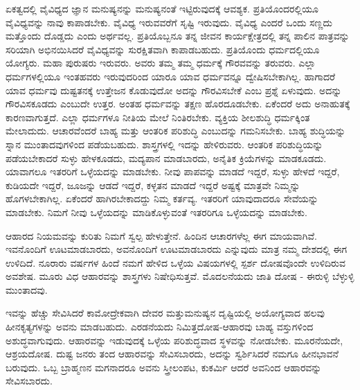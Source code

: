 ಏಕತ್ವದಲ್ಲಿ ವೈವಿಧ್ಯದ ಜ್ಞಾನ ಮನುಷ್ಯನನ್ನು ಮನುಷ್ಯನಂತೆ ಇಟ್ಟಿರುವುದಕ್ಕೆ ಆವಶ್ಯಕ. ಪ್ರತಿಯೊಂದರಲ್ಲಿಯೂ ವೈವಿಧ್ಯವನ್ನು ನಾವು ಕಾಪಾಡಬೇಕು. ವೈವಿಧ್ಯ ಇರುವವರೆಗೆ ಸೃಷ್ಟಿ ಇರುವುದು. ವೈವಿಧ್ಯ ಎಂದರೆ ಒಂದು ಸಣ್ಣದು ಮತ್ತೊಂದು ದೊಡ್ಡದು ಎಂದು ಅರ್ಥವಲ್ಲ. ಪ್ರತಿಯೊಬ್ಬನೂ ತನ್ನ ಜೀವನ ಕಾರ್ಯಕ್ಷೇತ್ರದಲ್ಲಿ ತನ್ನ ಪಾಲಿನ ಪಾತ್ರವನ್ನು ಸರಿಯಾಗಿ ಅಭಿನಯಿಸಿದರೆ ವೈವಿಧ್ಯವನ್ನು ಸುರಕ್ಷಿತವಾಗಿ ಕಾಪಾಡಬಹುದು. ಪ್ರತಿಯೊಂದು ಧರ್ಮದಲ್ಲಿಯೂ ಯೋಗ್ಯರು. ಮಹಾ ಪುರುಷರು ಇರುವರು. ಅವರು ತಮ್ಮ ತಮ್ಮ ಧರ್ಮಕ್ಕೆ ಗೌರವವನ್ನು ತರುವರು. ಎಲ್ಲಾ ಧರ್ಮಗಳಲ್ಲಿಯೂ ಇಂತಹವರು ಇರುವುದರಿಂದ ಯಾರೂ ಯಾವ ಧರ್ಮವನ್ನೂ ದ್ವೇಷಿಸಬೇಕಾಗಿಲ್ಲ. ಹಾಗಾದರೆ ಯಾವ ಧರ್ಮವು ದುಷ್ಟತನಕ್ಕೆ ಉತ್ತೇಜನ ಕೊಡುವುದೋ ಅದನ್ನು ಗೌರವಿಸಬೇಕೆ ಎಂಬ ಪ್ರಶ್ನೆ ಏಳುವುದು. ಅದನ್ನು ಗೌರವಿಸಕೂಡದು ಎಂಬುದೇ ಉತ್ತರ. ಅಂತಹ ಧರ್ಮವನ್ನು ತಕ್ಷಣ ಹೊರದೂಡಬೇಕು. ಏಕೆಂದರೆ ಅದು ಅನಾಹುತಕ್ಕೆ ಕಾರಣವಾಗುತ್ತದೆ. ಎಲ್ಲಾ ಧರ್ಮಗಳೂ ನೀತಿಯ ಮೇಲೆ ನಿಂತಿರಬೇಕು. ವ್ಯಕ್ತಿಯ ಶೀಲಶುದ್ಧಿ ಧರ್ಮಕ್ಕಿಂತ ಮೇಲಾದುದು. ಆಚಾರವೆಂದರೆ ಬಾಹ್ಯ ಮತ್ತು ಆಂತರಿಕ ಪರಿಶುದ್ಧಿ ಎಂಬುದನ್ನು ಗಮನಿಸಬೇಕು. ಬಾಹ್ಯ ಶುದ್ಧಿಯನ್ನು ಸ್ನಾನ ಮುಂತಾದವುಗಳಿಂದ ಪಡೆಯಬಹುದು. ಶಾಸ್ತ್ರಗಳಲ್ಲಿ ಇದನ್ನು ಹೇಳಿರುವರು. ಆಂತರಿಕ ಪರಿಶುದ್ಧಿಯನ್ನು ಪಡೆಯಬೇಕಾದರೆ ಸುಳ್ಳು ಹೇಳಕೂಡದು, ಮದ್ಯಪಾನ ಮಾಡಬಾರದು, ಅನೈತಿಕ ಕ್ರಿಯೆಗಳನ್ನು ಮಾಡಕೂಡದು. ಯಾವಾಗಲೂ ಇತರರಿಗೆ ಒಳ್ಳೆಯದನ್ನು ಮಾಡಬೇಕು. ನೀವು ಪಾಪವನ್ನು ಮಾಡದೆ ಇದ್ದರೆ, ಸುಳ್ಳು ಹೇಳದೆ ಇದ್ದರೆ, ಕುಡಿಯದೇ ಇದ್ದರೆ, ಜೂಜನ್ನು ಆಡದೆ ಇದ್ದರೆ, ಕಳ್ಳತನ ಮಾಡದೆ ಇದ್ದರೆ ಅಷ್ಟಕ್ಕೆ ಮಾತ್ರವೇ ನಿಮ್ಮನ್ನು ಹೊಗಳಬೇಕಾಗಿಲ್ಲ. ಏಕೆಂದರೆ ಹಾಗಿರಬೇಕಾದದ್ದು ನಿಮ್ಮ ಕರ್ತವ್ಯ. ಇತರರಿಗೆ ಯಾವುದಾದರೂ ಸೇವೆಯನ್ನು ಮಾಡಬೇಕು. ನಿಮಗೆ ನೀವು ಒಳ್ಳೆಯದನ್ನು ಮಾಡಿಕೊಳ್ಳುವಂತೆ ಇತರರಿಗೂ ಒಳ್ಳೆಯದನ್ನು ಮಾಡಬೇಕು.

ಆಹಾರದ ನಿಯಮವನ್ನು ಕುರಿತು ನಿಮಗೆ ಸ್ವಲ್ಪ ಹೇಳುತ್ತೇನೆ. ಹಿಂದಿನ ಆಚಾರಗಳೆಲ್ಲ ಈಗ ಮಾಯವಾಗಿವೆ. ಇವನೊಂದಿಗೆ ಊಟಮಾಡಬಾರದು, ಅವನೊಂದಿಗೆ ಊಟಮಾಡಬಾರದು ಎನ್ನುವುದು ಮಾತ್ರ ನಮ್ಮ ದೇಶದಲ್ಲಿ ಈಗ ಉಳಿದಿದೆ. ನೂರಾರು ವರ್ಷಗಳ ಹಿಂದೆ ನಮಗೆ ಹೇಳಿದ ಒಳ್ಳೆಯ ವಿಷಯಗಳಲ್ಲಿ ಸ್ಪರ್ಶ ದೋಷವೊಂದೇ ಉಳಿದಿರುವ ಅವಶೇಷ. ಮೂರು ವಿಧ ಆಹಾರವನ್ನು ಶಾಸ್ತ್ರಗಳು ನಿಷೇಧಿಸುತ್ತವೆ. ಮೊದಲನೆಯದು ಜಾತಿ ದೋಷ - ಈರುಳ್ಳಿ ಬೆಳ್ಳುಳ್ಳಿ ಮುಂತಾದವು.

ಇವನ್ನು ಹೆಚ್ಚು ಸೇವಿಸಿದರೆ ಕಾಮೋದ್ರೇಕವಾಗಿ ದೇವರ ಮತ್ತು\break ಮನುಷ್ಯನ ದೃಷ್ಟಿಯಲ್ಲಿ ಅಯೋಗ್ಯವಾದ ಹಲವು ಹೀನಕೃತ್ಯಗಳನ್ನು ಅವನು ಮಾಡಬಹುದು. ಎರಡನೆಯದು ನಿಮಿತ್ತದೋಷ-ಆಹಾರವು ಬಾಹ್ಯ ವಸ್ತುಗಳಿಂದ ಅಶುದ್ಧವಾಗುವುದು. ಆಹಾರವನ್ನು ಇಡುವುದಕ್ಕೆ ಒಳ್ಳೆಯ ಪರಿಶುದ್ಧವಾದ ಸ್ಥಳವನ್ನು ನೋಡಬೇಕು. ಮೂರನೆಯದೇ, ಆಶ್ರಯದೋಷ. ದುಷ್ಟ ಜನರು ತಂದ ಆಹಾರವನ್ನು ಸೇವಿಸಬಾರದು, ಅದನ್ನು ಸ್ವರ್ಶಿಸಿದರೆ ನಮಗೂ ಹೀನಭಾವನೆ ಬರುವುದು. ಒಬ್ಬ ಬ್ರಾಹ್ಮಣನ ಮಗನಾದರೂ ಅವನು ಸ್ತ್ರೀಲಂಪಟ, ಕುಕರ್ಮಿ ಆದರೆ ಅವನಿಂದ ಆಹಾರವನ್ನು ಸೇವಿಸಬಾರದು.

